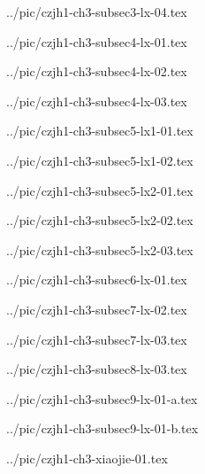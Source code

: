 

../pic/czjh1-ch3-subsec3-lx-04.tex



../pic/czjh1-ch3-subsec4-lx-01.tex



../pic/czjh1-ch3-subsec4-lx-02.tex



../pic/czjh1-ch3-subsec4-lx-03.tex



../pic/czjh1-ch3-subsec5-lx1-01.tex



../pic/czjh1-ch3-subsec5-lx1-02.tex



../pic/czjh1-ch3-subsec5-lx2-01.tex



../pic/czjh1-ch3-subsec5-lx2-02.tex



../pic/czjh1-ch3-subsec5-lx2-03.tex



../pic/czjh1-ch3-subsec6-lx-01.tex



../pic/czjh1-ch3-subsec7-lx-02.tex



../pic/czjh1-ch3-subsec7-lx-03.tex



../pic/czjh1-ch3-subsec8-lx-03.tex



../pic/czjh1-ch3-subsec9-lx-01-a.tex



../pic/czjh1-ch3-subsec9-lx-01-b.tex



../pic/czjh1-ch3-xiaojie-01.tex



